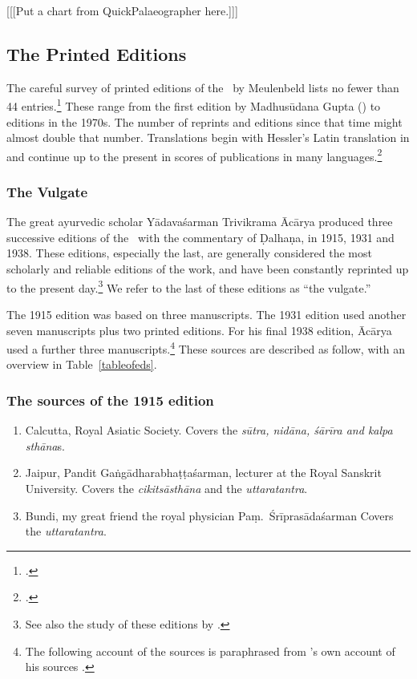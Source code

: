[[[Put a chart from QuickPalaeographer here.]]]

\subsection{The Printed Editions}

The careful survey of printed editions of the \SS\ by Meulenbeld lists no fewer than 
44 entries.\footcite[IIB, 311--314]{meul-hist}  These range from the first edition 
by 
Madhusūdana Gupta (\citeyear{gupt-1835}) to editions in the 1970s. The 
number of 
reprints and editions since that time might almost double that number.  
Translations begin with Hessler's Latin translation in \citeyear{hess-1855} and 
continue up to the present in scores of publications in many 
languages.\footcites[E.g.,][IIB, 314--315]{meul-hist}{zysk-1984}

\subsubsection{The Vulgate}


The great ayurvedic scholar Yādavaśarman Trivikrama Ācārya produced three 
successive editions of the
\SS\ with the commentary of Ḍalhaṇa, in 1915, 1931 and 1938.  These
editions, especially the last, are generally considered the most 
scholarly
and reliable editions of the work, and have been constantly reprinted up
to the present day.\footnote{See also the study of these editions by \textcites[\S 
1.2]{kleb-2021b}[143--144]{wuja-2013}.}  We refer to the last of these editions 
as “the vulgate.”

The 1915 edition was based on three manuscripts.  The 1931 edition used another
seven manuscripts plus two printed editions.  For his final 1938 edition, Ācārya
used a further three manuscripts.\footnote{The following account of the sources is
paraphrased from \citeauthor{vulgate}'s own account of his sources
\citep[22]{vulgate}.}  These sources are described as follow, with an overview in
Table~\ref{tableofeds}.

\subsubsection{The sources of the 1915 edition}

\begin{enumerate}
    \item[1] Calcutta, Royal Asiatic Society.  Covers the \emph{sūtra, nidāna, śārīra 
    and 
        kalpa sthāna}s.  
    
    \item [2] Jaipur, Pandit Gaṅgādharabhaṭṭaśarman, lecturer at the Royal 
    Sanskrit University.  Covers the \emph{cikitsāsthāna} and the 
    \emph{uttaratantra}.
    
    \item [3]  Bundi, my great friend the royal physician Paṃ.\ Śrīprasādaśarman  
    Covers the \emph{uttaratantra}.
\end{enumerate}

